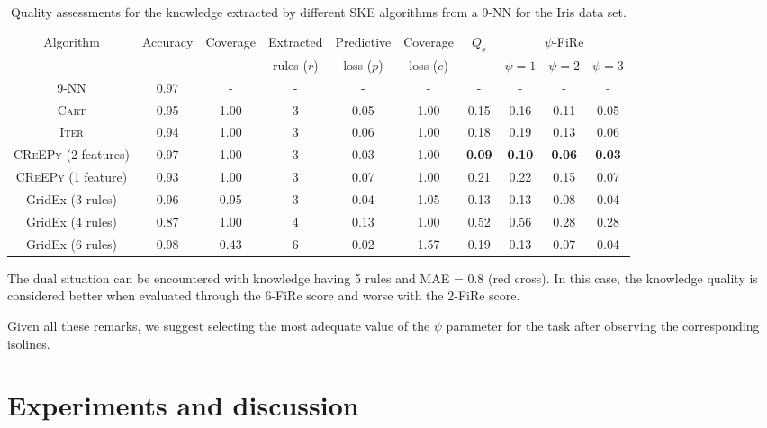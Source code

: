 \documentclass{article}
\newcommand{\iter}{\textsc{Iter}}
\newcommand{\gridex}{GridEx}
\newcommand{\creepy}{\textsc{CReEPy}}
\newcommand{\cart}{\textsc{Cart}}
\newcommand{\fire}{FiRe}
\newcommand{\psifire}{$\psi$-\fire}
\begin{document}
\begin{table}[t]\centering
	\begin{tabular}{|c||c|c|c|c|c||c|c|c|c|}
		\toprule
		Algorithm & Accuracy & Coverage & Extracted & Predictive & Coverage & $Q_s$ & \multicolumn{3}{c|}{\psifire{}} \\
		& & & rules ($r$) & loss ($p$) & loss ($c$) & & $\psi=1$ & $\psi=2$ & $\psi=3$ \\
		\midrule\midrule
		9-NN & 0.97 & - & - & - & - & - & - & - & - \\
		\midrule
		\cart{} & 0.95 & 1.00 & 3 & 0.05 & 1.00 & 0.15 & 0.16 & 0.11 & 0.05 \\
		\iter{} & 0.94 & 1.00 & 3 & 0.06 & 1.00 & 0.18 & 0.19 & 0.13 & 0.06 \\
		\creepy{} (2 features) & 0.97 & 1.00 & 3 & 0.03 & 1.00 & \textbf{0.09} & \textbf{0.10} & \textbf{0.06} & \textbf{0.03} \\
		\creepy{} (1 feature) & 0.93 & 1.00 & 3 & 0.07 & 1.00 & 0.21 & 0.22 & 0.15 & 0.07 \\
		\gridex{} (3 rules) & 0.96 & 0.95 & 3 & 0.04 & 1.05 & 0.13 & 0.13 & 0.08 & 0.04 \\
		\gridex{} (4 rules) & 0.87 & 1.00 & 4 & 0.13 & 1.00 & 0.52 & 0.56 & 0.28 & 0.28 \\
		\gridex{} (6 rules) & 0.98 & 0.43 & 6 & 0.02 & 1.57 & 0.19 & 0.13 & 0.07 & 0.04 \\
		\bottomrule
	\end{tabular}
	\caption{Quality assessments for the knowledge extracted by different SKE algorithms from a 9-NN for the Iris data set.}
	\label{tab:experiments}
\end{table}

The dual situation can be encountered with knowledge having 5 rules and MAE = 0.8 (red cross).
%
In this case, the knowledge quality is considered better when evaluated through the 6-\fire{} score and worse with the 2-\fire{} score.

Given all these remarks, we suggest selecting the most adequate value of the $\psi$ parameter for the task after observing the corresponding isolines.

\section{Experiments and discussion}\label{sec:experiments}
\end{document}
